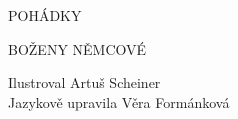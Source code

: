 \documentclass[a4paper]{article}
\begin{document}
\begin{centering}
\fontsize{56}{56}\selectfont
POHÁDKY\\
\bigskip

\fontsize{35}{35}\selectfont
BOŽENY NĚMCOVÉ

\vfill
\fontsize{18}{18}\selectfont
Ilustroval Artuš Scheiner\\
Jazykově upravila Věra Formánková

\vspace{0.5\textheight}
\end{centering}
\end{document}
